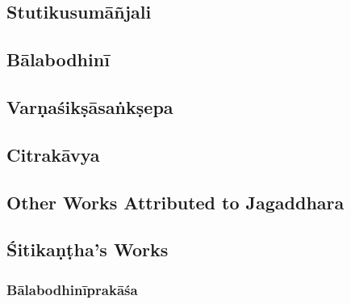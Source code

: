 \subsection{Stutikusumāñjali}

\subsection{Bālabodhinī}

\subsection{Varṇaśikṣāsaṅkṣepa}

\subsection{Citrakāvya}

\subsection{Other Works Attributed to Jagaddhara}

\subsection{Śitikaṇṭha's Works}

\subsubsection{Bālabodhinīprakāśa}

